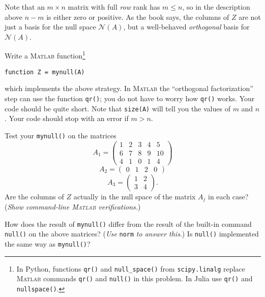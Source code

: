 \documentclass[12pt]{amsart}
\newcommand{\Matlab}{\textsc{Matlab}\xspace}
\begin{document}
\noindent Note that an $m\times n$ matrix with full \emph{row} rank has $m\le n$, so in the description above $n-m$ is either zero or positive.  As the book says, the columns of $Z$ are not just a basis for the null space $\mathcal{N}(A)$, but a well-behaved \emph{orthogonal} basis for $\mathcal{N}(A)$.

Write a \Matlab function\footnote{In Python, functions \texttt{qr()} and \texttt{null\_space()} from \texttt{scipy.linalg} replace \Matlab commands \texttt{qr()} and \texttt{null()} in this problem.  In Julia use \texttt{qr()} and \texttt{nullspace()}.}

\centerline{\texttt{function Z = mynull(A)}}

\noindent which implements the above strategy.  In \Matlab the ``orthogonal factorization'' step can use the function \verb|qr()|; you do not have to worry how \verb|qr()| works.  Your code should be quite short.  Note that \verb|size(A)| will tell you the values of $m$ and $n$.  Your code should stop with an error if $m>n$.

Test your \verb|mynull()| on the matrices
    $$A_1 = \begin{pmatrix}
    1 & 2 & 3 & 4 & 5 \\
    6 & 7 & 8 & 9 & 10 \\
    4 & 1 & 0 & 1 & 4
    \end{pmatrix}$$
    $$A_2 = \begin{pmatrix} 0 & 1 & 2 & 0 \end{pmatrix}$$
    $$A_3 = \begin{pmatrix} 1 & 2 \\ 3 & 4 \end{pmatrix}.$$
Are the columns of $Z$ actually in the null space of the matrix $A_j$ in each case?  (\emph{Show command-line \Matlab verifications.})

How does the result of \verb|mynull()| differ from the result of the built-in command \verb|null()| on the above matrices?  (\emph{Use} \verb|norm| \emph{to answer this}.)  Is \verb|null()| implemented the same way as \verb|mynull()|?
\end{document}
